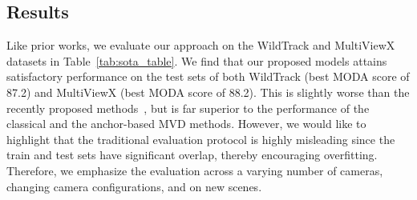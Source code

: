 \documentclass[letterpaper, 10 pt, conference]{ieeeconf}  \usepackage{times}
\begin{document}
\begin{table*}[t]
\centering
\caption{Results for evaluating with a varying number of cameras. The model is trained on all 7 cameras on WildTrack, and is tested on 2 different sets of 4 cameras each.}

\label{tab:per_inv}
\end{table*}


\subsection{Results}
Like prior works, we evaluate our approach on the WildTrack and MultiViewX datasets in Table~\ref{tab:sota_table}. We find that our proposed models attains satisfactory performance on the test sets of both WildTrack (best MODA score of 87.2)  and MultiViewX (best MODA score of 88.2). This is slightly worse than the recently proposed methods~\cite{hou2021multiview,song2021stacked}, but is far superior to the performance of the classical and the anchor-based MVD methods. However, we would like to highlight that the traditional evaluation protocol is highly misleading since the train and test sets have significant overlap, thereby encouraging overfitting. Therefore, we emphasize the evaluation across a varying number of cameras, changing camera configurations, and on new scenes. 
\end{document}
